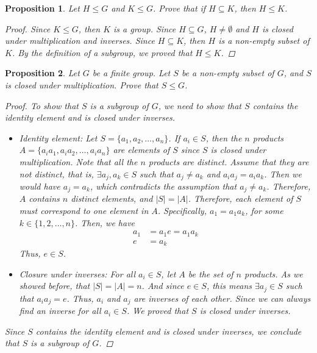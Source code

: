 \documentclass[12pt]{article}
\newtheorem{proposition}{Proposition}
\begin{document}
\begin{proposition}
  Let $H \leqslant G$ and $K \leqslant G$.
  Prove that if $H \subseteq K$, then $H \leqslant K$.
  \begin{proof}
    Since $K \leqslant G$, then $K$ is a group.
    Since $H \subseteq G$, $H \neq \emptyset$ and $H$ is closed under multiplication and inverses.
    Since $H \subseteq K$, then $H$ is a non-empty subset of $K$.
    By the definition of a subgroup, we proved that $H \leqslant K$.
  \end{proof}
\end{proposition}


\begin{proposition}
  Let $G$ be a finite group. Let $S$ be a non-empty subset of $G$, and $S$ is closed under multiplication.
  Prove that $S \leqslant G$.
  \begin{proof}
    To show that $S$ is a subgroup of $G$, we need to show that $S$ contains the identity element and is closed under inverses.
    \begin{itemize}
      \item Identity element: Let $S = \{a_1, a_2, \ldots, a_n\}$. If $a_i \in S$, then the $n$ products
            $A = \{a_ia_1, a_ia_2, \ldots, a_ia_n\}$ are elements of $S$ since $S$ is closed under multiplication.
            Note that all the $n$ products are distinct. Assume that they are not distinct, that is, $\exists a_j, a_k \in S$ such that
            $a_j \neq a_k$ and $a_ia_j = a_ia_k$. Then we would have $a_j = a_k$, which contradicts the assumption that $a_j \neq a_k$.
            Therefore, $A$ contains $n$ distinct elements, and $|S| = |A|$. Therefore, each element of $S$ must correspond to one element in $A$.
            Specifically, $a_1 = a_1a_k$, for some $k \in \{1, 2, \ldots, n\}$. Then, we have
            \begin{align*}
              a_1 & = a_1e = a_1a_k \\
              e   & = a_k
            \end{align*}
            Thus, $e \in S$.
      \item Closure under inverses: For all $a_i \in S$, let $A$ be the set of $n$ products. As we showed before, that $|S| = |A| = n$.
            And since $e \in S$, this means $\exists a_j \in S$ such that $a_ia_j = e$.
            Thus, $a_i$ and $a_j$ are inverses of each other.
            Since we can always find an inverse for all $a_i \in S$. We proved that $S$ is closed under inverses.
    \end{itemize}
    Since $S$ contains the identity element and is closed under inverses, we conclude that $S$ is a subgroup of $G$.
  \end{proof}
\end{proposition}
\end{document}
